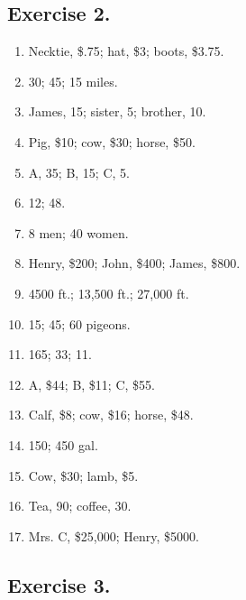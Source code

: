 \documentclass{book}
\begin{document}
\subsection*{Exercise 2.}
\begin{enumerate}

 \item Necktie, \$.75; hat, \$3; boots, \$3.75.

\item 30; 45; 15 miles.

\item James, 15; sister, 5; brother, 10.

\item Pig, \$10; cow, \$30; horse, \$50.

\item A, 35; B, 15; C, 5.

\item 12; 48.

\item 8 men; 40 women.

\item Henry, \$200; John, \$400; James, \$800.

\item 4500 ft.; 13,500 ft.; 27,000 ft.

\item 15; 45; 60 pigeons.

\item 165; 33; 11.

\item A, \$44; B, \$11; C, \$55.

\item Calf, \$8; cow, \$16; horse, \$48.

\item 150; 450 gal.

\item Cow, \$30; lamb, \$5.

\item Tea, 90; coffee, 30.

\item Mrs. C, \$25,000; Henry, \$5000.
\end{enumerate}

\subsection*{Exercise 3.}
\end{document}
